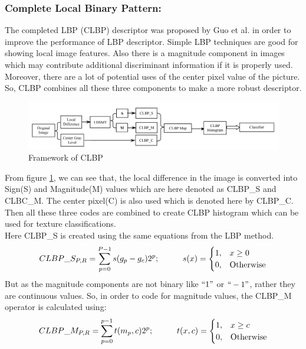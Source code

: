 \documentclass[12pt]{article}
\newcommand\tab[1][1cm]{\hspace*{#1}}
\begin{document}
\subsubsection{Complete Local Binary Pattern:}
The completed
LBP (CLBP) descriptor was proposed by Guo et al.\cite{clbp01}
in order to improve the performance of LBP descriptor. Simple LBP techniques are good for showing local image features. Also there is a magnitude component in images which may contribute
additional discriminant information if it is properly used. Moreover, there are a lot of potential uses of the center pixel value of the picture\cite{Varma2003}. So, CLBP combines all these three components to make a more robust descriptor.
\begin{figure}[h]
	
	\centering
	\includegraphics[width=\textwidth]{clbp_frameWorkPaper}
	\caption{Framework of CLBP}
	\label{figure:clbp1}	
\end{figure}
From figure \ref{figure:clbp1}, we can see that, the local difference in the image is converted into Sign(S) and Magnitude(M) values which are here denoted as CLBP\_S and CLBC\_M. The center pixel(C) is also used which is denoted here by CLBP\_C. Then all these three codes are combined to create CLBP histogram which can be used for texture classifications.\\
\linebreak
Here  CLBP\_S is created using the same equations from the LBP method.
\begin{equation}
CLBP\_S_{P,R}=\sum\limits_{p=0}^{P-1}{s({{g}_{p}}-{{g}_{c}}){{2}^{p}}}; \tab  s(x)= 
\begin{cases}
1,&  x\geq 0\\
0,&  \text{Otherwise}
\end{cases}
\label{equation:2.5}
\end{equation}
But as the magnitude components are not binary like $``1"$ or $``-1"$, rather they are continuous values. So, in order to code for magnitude values, the CLBP\_M operator is calculated using:
\begin{equation}
CLBP\_M_{P,R}=\sum\limits_{p=0}^{p-1}{t(m_p,c){{2}^{p}}}; \tab  t(x,c)= 
\begin{cases}
1,&  x \geq c\\
0,&  \text{Otherwise}
\end{cases}
\label{equation:2.6}
\end{equation}
\end{document}
